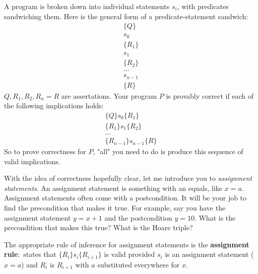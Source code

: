 \documentclass[nobib]{tufte-handout}
\newcommand{\defn}[2]{\noindent\textbf{#1}:\ #2}
\begin{document}
A program is broken down into individual statements $s_i$, with predicates
sandwiching them.
Here is the general form of a predicate-statement sandwich: 
\begin{align*}
    \{Q\} \\
    s_0 \\
    \{R_1\} \\
    s_1 \\
    \{R_2\} \\
    \dots \\
    s_{n-1} \\
    \{R\}
\end{align*}
$Q, R_1, R_2, R_n = R$ are assertations. Your program $P$ is provably correct if
each of the following implications holds: 
\begin{align*}
    \{Q\}s_0\{R_1\} \\
    \{R_1\}s_1\{R_2\} \\
    \dots \\
    \{R_{n-1}\}s_{n-1}\{R\}
\end{align*}
So to prove correctness for $P$, "all" you need to do is 
produce this sequence of valid implications. 

With the idea of correctness hopefully clear, let me introduce you to 
\emph{assignment statements}. An assignment statement is something 
with an equals, like $x = a$.
Assignment statements often come with a postcondition. 
It will be your job to find 
the precondition that makes it true. For example, say you have 
the assignment statement $y = x + 1$ and the postcondition $y = 10$. 
What is the precondition that makes this true? What is the Hoare triple?

The appropriate rule of inference for assignment statements is the 
\defn{assignment rule}{states that $\{R_i\}s_i\{R_{i+1}\}$ is valid 
provided $s_i$ is an assignment statement ($x = a$) and $R_i$ is 
$R_{i+1}$ with $a$ substituted everywhere for $x$.}

\end{document}
